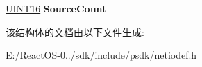 \begin{DoxyCompactItemize}
\begin{tabbing}
\end{tabbing}\item 
\mbox{\label{struct___i_g_m_p_v3___q_u_e_r_y___h_e_a_d_e_r_a635ff60f6f55a3b68faabaf2c6fa8893}} 
\hyperlink{_processor_bind_8h_a09f1a1fb2293e33483cc8d44aefb1eb1}{U\+I\+N\+T16} {\bfseries Source\+Count}
\end{DoxyCompactItemize}


该结构体的文档由以下文件生成\+:\begin{DoxyCompactItemize}
\item 
E\+:/\+React\+O\+S-\/0../sdk/include/psdk/netiodef.\+h\end{DoxyCompactItemize}
